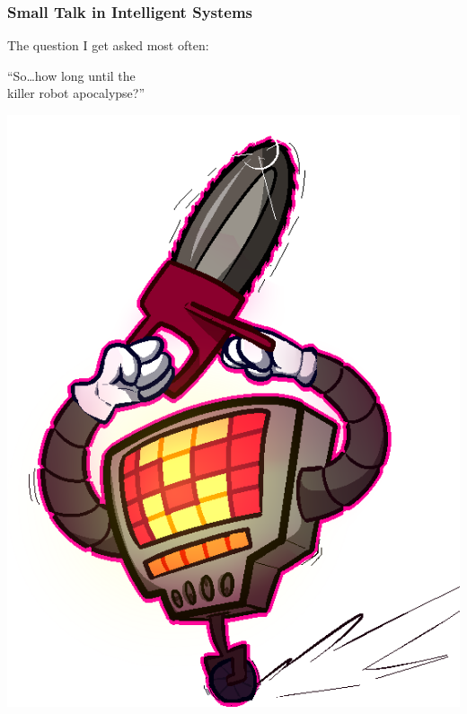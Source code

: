 \documentclass[aspectratio=169,x11names]{beamer}
\begin{document}

\begin{frame}
\frametitle{Small Talk in Intelligent Systems}

\begin{multicols}{2}

The question I get asked most often:

\pause

\begin{center}
``So\dots how long until the\\ killer robot apocalypse?''
\end{center}

\columnbreak

\begin{center}
\includegraphics[height=0.7\textheight,keepaspectratio]{images/mtt.png} 
\end{center}

\end{multicols}

\end{frame}
\end{document}
